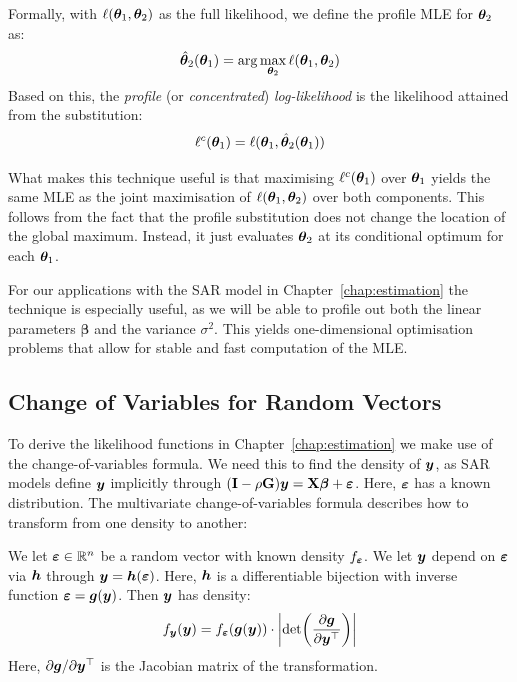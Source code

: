 Formally, with $\ell(\bm{\theta}_1, \bm{\theta}_2)$ as the full likelihood, we define the profile MLE for $\bm{\theta}_2$ as:
\begin{equation}
    \hat{\bm{\theta}}_2(\bm{\theta}_1) = \arg\max_{\bm{\theta}_2} \ell(\bm{\theta}_1, \bm{\theta}_2)
\end{equation}
Based on this, the \emph{profile} (or \emph{concentrated}) \emph{log-likelihood} is the likelihood attained from the substitution:
\begin{equation}
    \ell^c(\bm{\theta}_1) = \ell(\bm{\theta}_1, \hat{\bm{\theta}}_2(\bm{\theta}_1))
\end{equation}

What makes this technique useful is that maximising $\ell^c(\bm{\theta}_1)$ over $\bm{\theta}_1$ yields the same MLE as the joint maximisation of $\ell(\bm{\theta}_1, \bm{\theta}_2)$ over both components. This follows from the fact that the profile substitution does not change the location of the global maximum. Instead, it just evaluates $\bm{\theta}_2$ at its conditional optimum for each $\bm{\theta}_1$.

For our applications with the SAR model in Chapter~\ref{chap:estimation} the technique is especially useful, as we will be able to profile out both the linear parameters $\bm{\beta}$ and the variance $\sigma^2$. This yields one-dimensional optimisation problems that allow for stable and fast computation of the MLE\@.

\subsection{Change of Variables for Random Vectors}
\label{sec:bg:change_of_variables}
To derive the likelihood functions in Chapter~\ref{chap:estimation} we make use of the change-of-variables formula. We need this to find the density of $\bm{y}$, as SAR models define $\bm{y}$ implicitly through $(\mathbf{I} - \rho\mathbf{G})\bm{y} = \mathbf{X}\bm{\beta} + \bm{\varepsilon}$. Here, $\bm{\varepsilon}$ has a known distribution. The multivariate change-of-variables formula describes how to transform from one density to another:

\begin{theorem}
\label{thm:change_of_variables}
We let $\bm{\varepsilon} \in \mathbb{R}^n$ be a random vector with known density $f_{\bm{\varepsilon}}$. We let $\bm{y}$ depend on $\bm{\varepsilon}$ via $\bm{h}$ through $\bm{y} = \bm{h}(\bm{\varepsilon})$. Here, $\bm{h}$ is a differentiable bijection with inverse function $\bm{\varepsilon} = \bm{g}(\bm{y})$. Then $\bm{y}$ has density:
\begin{equation}
\label{eq:change_of_variables}
    f_{\bm{y}}(\bm{y}) = f_{\bm{\varepsilon}}(\bm{g}(\bm{y})) \cdot \left|\det\!\left(\frac{\partial \bm{g}}{\partial \bm{y}^\top}\right)\right|
\end{equation}
Here, $\partial \bm{g} / \partial \bm{y}^\top$ is the Jacobian matrix of the transformation.
\end{theorem}


